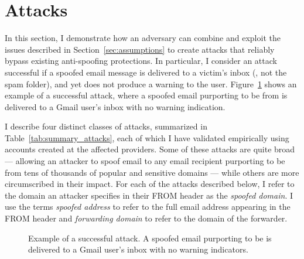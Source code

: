 
%
%

\section{Attacks}
\label{sec:attacks}
In this section, I demonstrate how an adversary can combine and
exploit the issues
described in Section~\ref{sec:assumptions} to create attacks that reliably
bypass existing anti-spoofing protections.  In particular, I consider an
attack successful if a spoofed email message is delivered to a
victim's inbox (\ie,  not the spam folder), and yet does not produce a
warning to the user.
Figure~\ref{fig:open_forwarding_attack_screenshot} shows
an example of a successful attack, where a spoofed
email purporting to be from  is delivered to a
Gmail user's inbox with no warning indication.

I describe four distinct classes of attacks, summarized in
Table~\ref{tab:summary_attacks}, each of which I have validated
empirically using accounts created at the affected providers.  Some of
these attacks are quite broad --- allowing an attacker to spoof email
to any email recipient purporting to be from tens of thousands of
popular and sensitive domains --- while others are more circumscribed
in their impact.
%
For each of the attacks described below, I refer to the domain an
attacker specifies in their \textsc{FROM} header as the
\textit{spoofed domain}.  I use the terms \textit{spoofed address} to
refer to the full email address appearing in the \textsc{FROM} header
and \textit{forwarding domain} to refer to the domain of the
forwarder.

\begin{figure}[t]
  \centering
{
    \setlength{\fboxsep}{0pt}
    \setlength{\fboxrule}{0.5pt}
}
  \caption[Example of a Successful Attack]{Example of a successful attack. A spoofed email purporting to be  is delivered to a Gmail user's inbox with no warning indicators.
}
\label{fig:open_forwarding_attack_screenshot}
\end{figure}


